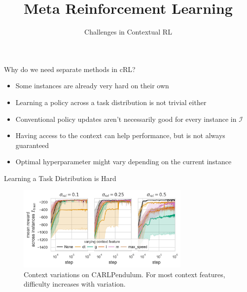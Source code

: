 \documentclass[aspectratio=169]{../latex_main/tntbeamer}  %
\title[Meta-RL]{Meta Reinforcement Learning}
\subtitle{Challenges in Contextual RL}
\begin{document}
	
	\maketitle

\begin{frame}[c]{Why do we need separate methods in cRL?}

\begin{itemize}
	\item Some instances are already very hard on their own
	\item Learning a policy across a task distribution is not trivial either
	\item Conventional policy updates aren't necessarily good for every instance in $\mathcal{I}$
	\item Having access to the context can help performance, but is not always guaranteed
	\item Optimal hyperparameter might vary depending on the current instance
\end{itemize}


\end{frame}
\begin{frame}[c]{Learning a Task Distribution is Hard}
	
\begin{figure}
    \centering
    \includegraphics[width=0.75\textwidth]{w09_meta_rl/images/CARLPendulumEnv_mean_ep_rew_over_step_hidden.png}
    \caption{Context variations on CARLPendulum. For most context features, difficulty increases with variation.}
    \label{fig:my_label}
\end{figure}
	
\end{frame}
\end{document}
